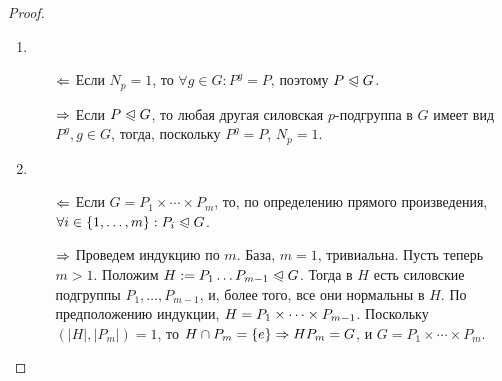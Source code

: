 \begin{proof}~
	\begin{enumerate}
		\item \begin{itemize}
			\item[$\Leftarrow$] Если $N_p = 1$, то $\forall g \in G: P^g = P$, поэтому $P \trianglelefteqslant G$.
			
			\item[$\Rightarrow$] Если $P \trianglelefteqslant G$, то любая другая силовская $p$-подгруппа в $G$ имеет вид $P^g, g \in G$, тогда, поскольку $P^g = P$, $N_p = 1$.
		\end{itemize}
	
		\item \begin{itemize}
			\item[$\Leftarrow$] Если $G = P_1 \times \dotsb \times P_m$, то, по определению прямого произведения, $\forall i \hm\in \{1, \dotsc, m\}: P_i \normal G$.
			
			\item[$\Rightarrow$] Проведем индукцию по $m$. База, $m = 1$, тривиальна. Пусть теперь $m > 1$. Положим $H := P_1\dots P_{m - 1} \trianglelefteqslant G$. Тогда в $H$ есть силовские подгруппы $P_1, \dotsc, P_{m - 1}$, и, более того, все они нормальны в $H$. По предположению индукции, $H \hm= P_1 \times \dotsb \times P_{m-1}$. Поскольку $(|H|, |P_m|) = 1$, то $H \cap P_m \hm= \{e\} \ra HP_m \hm= G$, и $G = P_1 \times \dotsb \times P_m$.
		\end{itemize}
	\end{enumerate}
\end{proof}